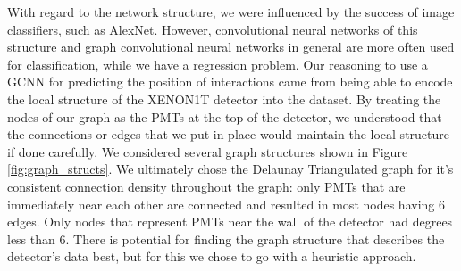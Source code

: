 \documentclass[thesis.tex]{subfiles}
\begin{document}
\par With regard to the network structure, we were influenced by the success of image classifiers, such as AlexNet.
However, convolutional neural networks of this structure and graph convolutional neural networks in general are more often used for classification, while we have a regression problem.
Our reasoning to use a GCNN for predicting the position of interactions came from being able to encode the local structure of the XENON1T detector into the dataset.
By treating the nodes of our graph as the PMTs at the top of the detector, we understood that the connections or edges that we put in place would maintain the local structure if done carefully.
We considered several graph structures shown in Figure \ref{fig:graph_structs}.
We ultimately chose the Delaunay Triangulated graph for it's consistent connection density throughout the graph: only PMTs that are immediately near each other are connected and resulted in most nodes having 6 edges.
Only nodes that represent PMTs near the wall of the detector had degrees less than 6.
There is potential for finding the graph structure that describes the detector's data best, but for this we chose to go with a heuristic approach.
\end{document}
